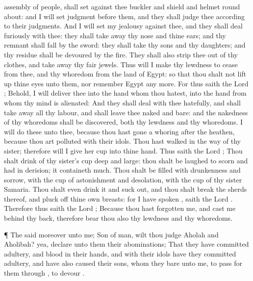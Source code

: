 {assembly of
people,
{} shall
set against thee
buckler and
shield and
helmet round
about: and I will
set
judgment
before them, and they shall
judge thee according to their
judgments.
And I will
set my
jealousy against thee, and they shall
deal
furiously with thee: they shall take
away thy
nose and thine
ears; and thy
remnant shall
fall by the
sword: they shall
take thy
sons and thy
daughters; and thy
residue shall be
devoured by the
fire.
They shall also
strip thee out of thy
clothes, and take
away thy
fair
jewels.
Thus will I make thy
lewdness to
cease from thee, and thy
whoredom
{} from the
land of
Egypt: so that thou shalt not lift
up thine
eyes unto them, nor
remember
Egypt any more.
For thus
saith the
Lord
{}; Behold, I will
deliver thee into the
hand
{} whom thou
hatest, into the
hand
{} from whom thy
mind is
alienated:
And they shall
deal with thee
hatefully, and shall take
away all thy
labour, and shall
leave thee
naked and
bare: and the
nakedness of thy
whoredoms shall be
discovered, both thy
lewdness and thy
whoredoms.
I will
do these
{} unto thee, because thou hast gone a
whoring
after the
heathen,
{} because thou art
polluted with their
idols.
Thou hast
walked in the
way of thy
sister; therefore will I
give her
cup into thine
hand.
Thus
saith the
Lord
{}; Thou shalt
drink of thy
sister’s
cup
deep and
large: thou shalt be laughed to
scorn and had in
derision; it
containeth
much.
Thou shalt be
filled with
drunkenness and
sorrow, with the
cup of
astonishment and
desolation, with the
cup of thy
sister
Samaria.
Thou shalt even
drink it and suck
{}
out, and thou shalt
break the
sherds thereof, and pluck
off thine own
breasts: for I have
spoken
{},
saith the
Lord
{}.
Therefore thus
saith the
Lord
{}; Because thou hast
forgotten me, and
cast me
behind thy
back, therefore
bear thou also thy
lewdness and thy
whoredoms.
\par }{\PP {}¶ The
{}
said moreover unto me;
Son of
man, wilt thou
judge
Aholah and
Aholibah? yea,
declare unto them their
abominations;
That they have committed
adultery, and
blood
{} in their
hands, and with their
idols have they committed
adultery, and have also caused their
sons, whom they
bare unto me, to pass for them
through
{}, to
devour
{}.
}
